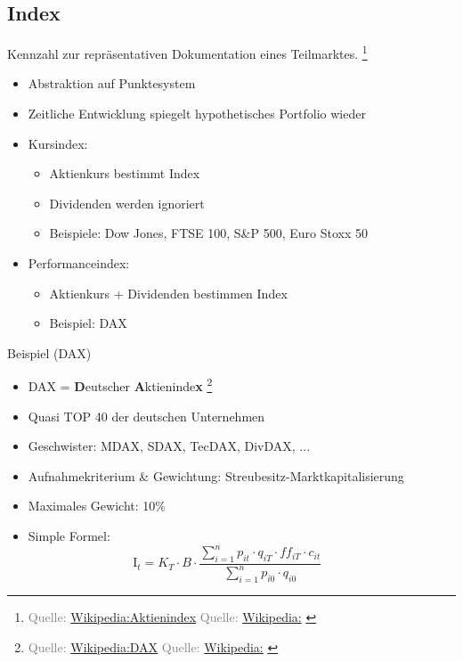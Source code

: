 \documentclass{beamer}
\let\oldfootnote\footnote
\renewcommand{\footnote}[1]
{%
	\oldfootnote
	{
		\tiny
		\textcolor{gray}{#1}
	}%
}
\newcommand{\citewiki}[2][]
{%
	\footnote
	{
		\ifthenelse{\isempty{#1}}
		{
			Quelle: \href{https://de.wikipedia.org/wiki/#2}{Wikipedia:#2}
		}
		{
			Quelle: \href{https://de.wikipedia.org/wiki/#2}{Wikipedia:#1}
		}
	}
}
\begin{document}
		\subsection{Index}
		
			\begin{frame}
				\begin{definition}
					Kennzahl zur repräsentativen Dokumentation eines Teilmarktes.\citewiki{Aktienindex}
				\end{definition}
			
				\begin{itemize}
					\item Abstraktion auf Punktesystem
					\item Zeitliche Entwicklung spiegelt hypothetisches Portfolio wieder
					\item Kursindex:
					\begin{itemize}
						\item Aktienkurs bestimmt Index
						\item Dividenden werden ignoriert
						\item Beispiele: Dow Jones, FTSE 100, S\&P 500, Euro Stoxx 50
					\end{itemize}
					\item Performanceindex:
					\begin{itemize}
						\item Aktienkurs + Dividenden bestimmen Index
						\item Beispiel: DAX
					\end{itemize}
				\end{itemize}
			\end{frame}
		
			\begin{frame}{Beispiel (DAX)}
				\begin{itemize}
					\item DAX = \textbf{D}eutscher \textbf{A}ktieninde\textbf{x}\citewiki{DAX}
					\item Quasi TOP 40 der deutschen Unternehmen
					\item Geschwister: MDAX, SDAX, TecDAX, DivDAX, ...
					\item Aufnahmekriterium \& Gewichtung: Streubesitz-Marktkapitalisierung
					\item Maximales Gewicht: 10\%
					\item Simple Formel:\pause
					\[
						\text{I}_t = K_T \cdot B \cdot \frac
						{
							\sum_{i=1}^{n} p_{it} \cdot q_{iT} \cdot ff_{iT} \cdot c_{it}
						}
						{
							\sum_{i=1}^{n} p_{i0} \cdot q_{i0}
						}\hspace{1cm}
					\]
				\end{itemize}
			\end{frame}
		
\end{document}

